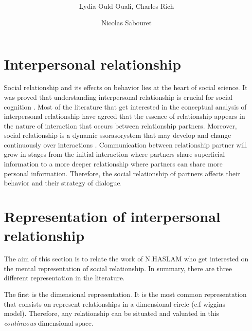 \documentclass{llncs}
\begin{document}
\title{  \vskip -10pt}

\author{Lydia Ould Ouali, Charles Rich \and
Nicolas Sabouret }

\maketitle 

\section{Interpersonal relationship}
Social relationship and its effects on behavior lies at the heart of social science. It was proved that understanding interpersonal relationship is crucial for social cognition \cite{reis2000relationship}. Most of the literature that get interested in the conceptual analysis of interpersonal relationship have agreed that the essence of relationship appears in the nature of interaction that occurs between relationship partners. Moreover, social relationship is a dynamic ssorasorystem that may develop and change continuously over interactions \cite{reis2000relationship,svennevig2000getting}.
Communication between relationship partner will grow in stages from the initial interaction where partners share superficial information to a more deeper relationship where partners can share more personal information. Therefore, the social relationship of partners affects their behavior and their strategy of dialogue.

\section{Representation of interpersonal relationship}

The aim of this section is to relate the work of N.HASLAM \cite{haslam1994mental} who get interested on the mental representation of social relationship. In summary, there are three different representation in the literature. 
\par The first is the dimensional representation. It is the most common representation that consists on represent relationships in a dimensional circle (c.f wiggins model). Therefore, any relationship can be situated and valuated  in this  \textit{continuous} dimensional space. 
\end{document}
